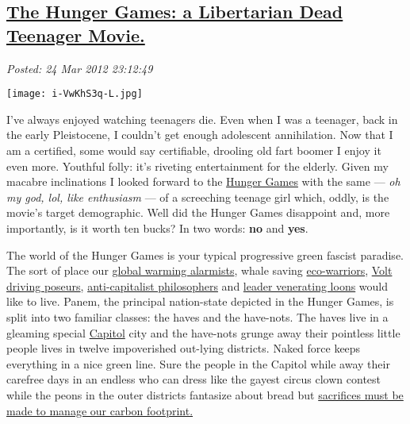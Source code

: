 %

\subsection*{\href{https://bakerjd99.wordpress.com/2012/03/24/the-hunger-games-a-libertarian-dead-teenager-movie/}{The Hunger Games: a Libertarian Dead Teenager Movie.}}


\noindent\emph{Posted: 24 Mar 2012 23:12:49}
\vspace{6pt}

\begin{floatingfigure}[l]{0.32\textwidth}
\centering
\texttt{[image: i-VwKhS3q-L.jpg]}
\label{fig:2685X0}
\end{floatingfigure}I've
always enjoyed watching teenagers die. Even when I was a teenager, back
in the early Pleistocene, I couldn't get enough adolescent annihilation.
Now that I am a certified, some would say certifiable, drooling old fart
boomer I enjoy it even more. Youthful folly: it's riveting entertainment
for the elderly. Given my macabre inclinations I looked forward to the
\href{http://www.thehungergamesmovie.com/}{Hunger Games} with the same
--- \emph{oh my god, lol, like enthusiasm} --- of a screeching teenage
girl which, oddly, is the movie's target demographic. Well did the
Hunger Games disappoint and, more importantly, is it worth ten bucks? In
two words: \textbf{no} and \textbf{yes}.

The world of the Hunger Games is your typical progressive green fascist
paradise. The sort of place our
\href{http://www.thenewamerican.com/usnews/politics/11094-ethical-meltdown-global-warming-alarmists-defend-peter-gleicks-theft-fraud}{global
warming alarmists}, whale saving
\href{http://bardofely.hubpages.com/hub/Was-Charles-Manson-the-first-eco-warrior}{eco-warriors},
\href{http://autos.aol.com/article/why-the-chevy-volt-is-attracting-wealthy-buyers/}{Volt
driving poseurs},
\href{http://www.thefreemanonline.org/book-reviews/the-complete-idiots-guide-to-economics/}{anti-capitalist
philosophers} and
\href{http://www.youtube.com/watch?v=KI-BCbKuJGA}{leader venerating
loons} would like to live. Panem, the principal nation-state depicted in
the Hunger Games, is split into two familiar classes: the haves and the
have-nots. The haves live in a gleaming special
\href{http://seattletimes.nwsource.com/html/microsoftpri0/2017796920\_touring\_the\_hunger\_games\_panems\_capitol\_city\_with.html}{Capitol}
city and the have-nots grunge away their pointless little people lives
in twelve impoverished out-lying districts. Naked force keeps everything
in a nice green line. Sure the people in the Capitol while away their
carefree days in an endless who can dress like the gayest circus clown
contest while the peons in the outer districts fantasize about bread but
\href{http://thehumanfuture.cbc-network.org/2012/03/global-warming-hysteria-embracing-their-inner-transhumanist/}{sacrifices
must be made to manage our carbon footprint.}

